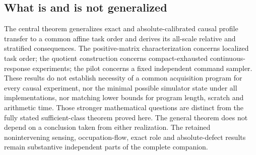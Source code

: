 \subsection*{What is and is not generalized}
The central theorem generalizes exact and absolute-calibrated causal profile transfer to a common affine task order and derives its all-scale relative and stratified consequences. The positive-matrix characterization concerns localized task order; the quotient construction concerns compact-exhausted continuous-response experiments; the pilot concerns a fixed independent command sampler. These results do not establish necessity of a common acquisition program for every causal experiment, nor the minimal possible simulator state under all implementations, nor matching lower bounds for program length, scratch and arithmetic time. Those stronger mathematical questions are distinct from the fully stated sufficient-class theorem proved here. The general theorem does not depend on a conclusion taken from either realization. The retained nonintervening sensing, occupation-flow, exact role and absolute-defect results remain substantive independent parts of the complete companion.
